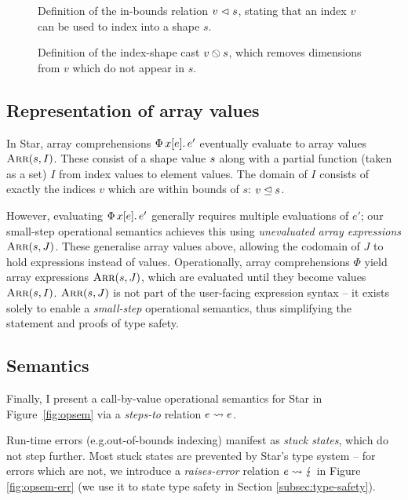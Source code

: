 \begin{figure}
    \centering
    
    \caption{Definition of the in-bounds relation $v \vartriangleleft s$, stating that an index $v$ can be used to index into a shape $s$.}
    \label{fig:in-bounds}
\end{figure}

\begin{figure}
    \centering
    
    \caption{Definition of the index-shape cast ${v} \obslash {s}$, which removes dimensions from $v$ which do not appear in $s$.}
    \label{fig:cast}
\end{figure}

\subsection{Representation of array values}
\label{subsec:array-values}

In Star, array comprehensions $\sbuild{x}{e}{e'}$ eventually evaluate to array values $\textsc{Arr}(s,I)$.
These consist of a shape value $s$ along with a partial function (taken as a set) $I$ from index values to element values.
The domain of $I$ consists of exactly the indices $v$ which are within bounds of $s$: $v \trianglelefteq s$.

However, evaluating  $\sbuild{x}{e}{e'}$ generally requires multiple evaluations of $e'$; our small-step operational semantics achieves this using \emph{unevaluated array expressions} $\textsc{Arr}(s,J)$.
These generalise array values above, allowing the codomain of $J$ to hold expressions instead of values.
Operationally, array comprehensions $\Phi$ yield array expressions $\textsc{Arr}(s,J)$, which are evaluated until they become values $\textsc{Arr}(s,I)$.
$\textsc{Arr}(s,J)$ is not part of the user-facing expression syntax -- it exists solely to enable a \emph{small-step} operational semantics, thus simplifying the statement and proofs of type safety.

\subsection{Semantics}
\label{subsec:semantics}

Finally, I present a call-by-value operational semantics for Star in Figure~\ref{fig:opsem} via a \emph{steps-to} relation $e \leadsto e$.

Run-time errors (e.g.\@ out-of-bounds indexing)
manifest as \emph{stuck states}, which do not step further. Most stuck states are prevented by Star's type system -- for errors which are not, we introduce a \emph{raises-error} relation $e \leadsto \lightning$ in Figure \ref{fig:opsem-err} (we use it to state type safety in Section \ref{subsec:type-safety}).

